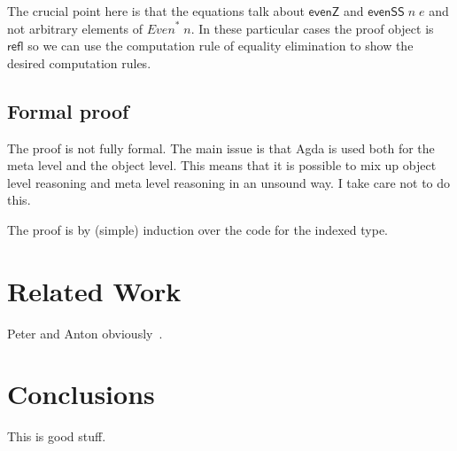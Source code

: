 \documentclass[11pt]{article}
\newcommand{\Varid}[1]{\mathit{#1}}
\begin{document}
The crucial point here is that the equations talk about \ensuremath{\mathsf{evenZ}} and \ensuremath{\mathsf{evenSS}\;\Varid{n}\;\Varid{e}} and not arbitrary elements of \ensuremath{\mathit{Even}^{*}\;\Varid{n}}. In these particular cases the proof
object is \ensuremath{\mathsf{refl}} so we can use the computation rule of equality elimination to
show the desired computation rules.

\subsection{Formal proof}

The proof is not fully formal. The main issue is that Agda is used both for the
meta level and the object level. This means that it is possible to mix up
object level reasoning and meta level reasoning in an unsound way. I take care
not to do this.

The proof is by (simple) induction over the code for the indexed type.

\section{Related Work}

Peter and Anton obviously~\cite{dybjer:indexed-ir}.

\section{Conclusions}

This is good stuff.



\end{document}
